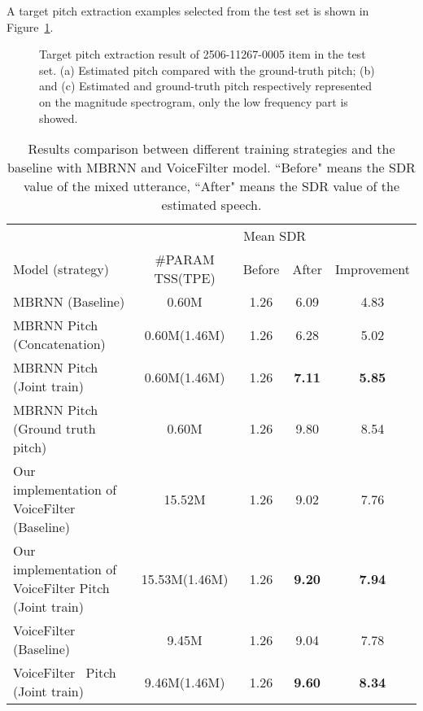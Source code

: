 \documentclass[
]{article}
\begin{document}
    A target pitch extraction examples selected from the test set is shown in Figure~\ref{fig:pitch_1}.
    \begin{figure}[t]

        \caption{Target pitch extraction result of 2506-11267-0005 item in the test set. (a) Estimated pitch compared with the ground-truth pitch; (b) and (c) Estimated and ground-truth pitch respectively represented on the magnitude spectrogram, only the low frequency part is showed. }
        \label{fig:pitch_1}
    \end{figure}

    \begin{table*}[!htbp]
        \centering
        \begin{tabular}{l|c|c|c|c}
            \toprule
            & \multicolumn{4}{c}{Mean SDR} \\
            Model (strategy)                             & \#PARAM TSS(TPE) & Before & After         & Improvement   \\
            \midrule
            MBRNN (Baseline)                             & 0.60M            & 1.26   & 6.09          & 4.83          \\
            MBRNN Pitch (Concatenation)                  & 0.60M(1.46M)     & 1.26   & 6.28          & 5.02          \\
            MBRNN Pitch (Joint train)                    & 0.60M(1.46M)     & 1.26   & \textbf{7.11} & \textbf{5.85} \\
            MBRNN Pitch (Ground truth pitch)             & 0.60M            & 1.26   & 9.80          & 8.54          \\
            \midrule
            Our implementation of VoiceFilter (Baseline) & 15.52M           & 1.26   & 9.02          & 7.76          \\
            Our implementation of VoiceFilter Pitch (Joint train) & 15.53M(1.46M) & 1.26 & \textbf{9.20}
            & \textbf{7.94}
            \\
            \midrule
            VoiceFilter~\cite{voicefilter} (Baseline)    & 9.45M            & 1.26   & 9.04          & 7.78          \\
            VoiceFilter~\cite{voicefilter} Pitch (Joint train) & 9.46M(1.46M) & 1.26 & \textbf{9.60}
            & \textbf{8.34}
            \\
            \bottomrule
        \end{tabular}
        \caption{Results comparison between different training strategies and the baseline with MBRNN and VoiceFilter model. ``Before" means the SDR value of the mixed utterance, ``After" means the SDR value of the estimated speech.}
        \label{tab:mbrnn_comparison}
    \end{table*}
\end{document}
